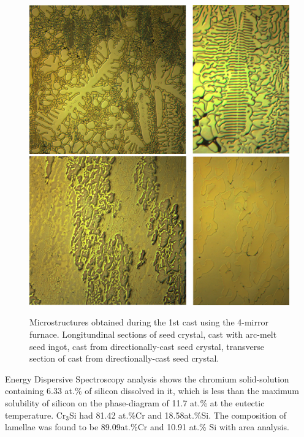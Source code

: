 \begin{figure}[H]
\begin{center}
\includegraphics{FirstCast_trans}
\includegraphics{FirstCast_long}
\caption{Microstructures obtained during the 1st cast using the 4-mirror furnace. Longitundinal sections of seed crystal, cast with arc-melt seed ingot, cast from directionally-cast seed crystal, transverse section of cast from directionally-cast seed crystal.}
\label{fig:FirstCast_micros}
\end{center}
\end{figure}
%

Energy Dispersive Spectroscopy analysis shows the chromium solid-solution containing 6.33 at.\% of silicon dissolved in it, which is less than the maximum solubility of silicon on the phase-diagram of 11.7 at.\% at the eutectic temperature. Cr$_3$Si had 81.42 at.\%Cr and 18.58at.\%Si. The composition of lamellae was found to be 89.09at.\%Cr and 10.91 at.\% Si with area analysis. 

